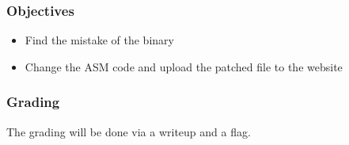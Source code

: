\subsubsection*{Objectives}
\begin{itemize}
    \item Find the mistake of the binary
    \item Change the ASM code and upload the patched file to the website
\end{itemize}
\subsubsection*{Grading}
The grading will be done via a writeup and a flag.
\pagebreak
